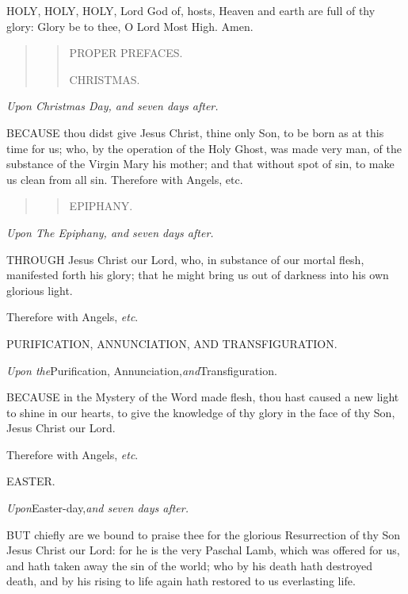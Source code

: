 HOLY, HOLY, HOLY, Lord God of, hosts, Heaven and earth are full of thy
glory: Glory be to thee, O Lord Most High. Amen.

\begin{quote}

\begin{quote}

PROPER
PREFACES.

CHRISTMAS.

\end{quote}

\end{quote}

\emph{Upon Christmas Day, and seven days after.}

BECAUSE
thou didst give Jesus Christ, thine only Son, to be born as at this time
for us; who, by the operation of the Holy Ghost, was made very man, of
the substance of the Virgin Mary his mother; and that without spot of
sin, to make us clean from all sin. Therefore with Angels, etc.

\begin{quote}

\begin{quote}

EPIPHANY.

\end{quote}

\end{quote}

\emph{Upon
The Epiphany, and seven days after.}

THROUGH
Jesus Christ our Lord, who, in substance of our mortal flesh, manifested
forth his glory; that he might bring us out of darkness into his own glorious
light. 

Therefore with Angels, \emph{etc}.

PURIFICATION, ANNUNCIATION,
AND TRANSFIGURATION.

\emph{Upon
the}Purification, Annunciation,\emph{and}Transfiguration.

BECAUSE
in the Mystery of the Word made flesh, thou hast caused a new light to
shine in our hearts, to give the knowledge of thy glory in the face of
thy Son, Jesus Christ our Lord.

Therefore with Angels, \emph{etc}.

EASTER.

\emph{Upon}Easter-day,\emph{and seven days after.}

BUT chiefly are we bound to praise thee
for the glorious Resurrection of thy Son Jesus Christ our Lord: for he
is the very Paschal Lamb, which was offered for us, and hath taken away
the sin of the world; who by his death hath destroyed death, and by his
rising to life again hath restored to us everlasting life. 

